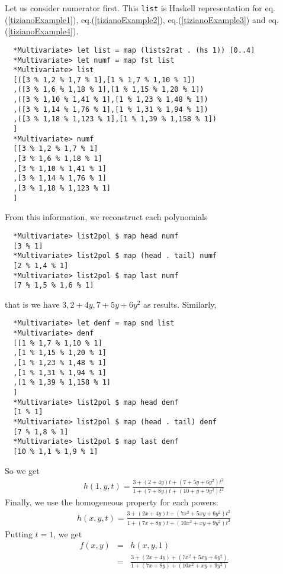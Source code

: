 \documentclass[11pt]{book}
\begin{document}
Let us consider numerator first.
This \texttt{list} is Haskell representation for eq.(\ref{tizianoExample1}), eq.(\ref{tizianoExample2}), eq.(\ref{tizianoExample3}) and eq.(\ref{tizianoExample4}).
\begin{verbatim}
  *Multivariate> let list = map (lists2rat . (hs 1)) [0..4]
  *Multivariate> let numf = map fst list
  *Multivariate> list
  [([3 % 1,2 % 1,7 % 1],[1 % 1,7 % 1,10 % 1])
  ,([3 % 1,6 % 1,18 % 1],[1 % 1,15 % 1,20 % 1])
  ,([3 % 1,10 % 1,41 % 1],[1 % 1,23 % 1,48 % 1])
  ,([3 % 1,14 % 1,76 % 1],[1 % 1,31 % 1,94 % 1])
  ,([3 % 1,18 % 1,123 % 1],[1 % 1,39 % 1,158 % 1])
  ]
  *Multivariate> numf
  [[3 % 1,2 % 1,7 % 1]
  ,[3 % 1,6 % 1,18 % 1]
  ,[3 % 1,10 % 1,41 % 1]
  ,[3 % 1,14 % 1,76 % 1]
  ,[3 % 1,18 % 1,123 % 1]
  ]
\end{verbatim}
From this information, we reconstruct each polynomials
\begin{verbatim}
  *Multivariate> list2pol $ map head numf
  [3 % 1]
  *Multivariate> list2pol $ map (head . tail) numf
  [2 % 1,4 % 1]
  *Multivariate> list2pol $ map last numf
  [7 % 1,5 % 1,6 % 1]
\end{verbatim}
that is we have $3, 2+4y, 7+5y+6y^2$ as results.
Similarly,
\begin{verbatim}
  *Multivariate> let denf = map snd list
  *Multivariate> denf
  [[1 % 1,7 % 1,10 % 1]
  ,[1 % 1,15 % 1,20 % 1]
  ,[1 % 1,23 % 1,48 % 1]
  ,[1 % 1,31 % 1,94 % 1]
  ,[1 % 1,39 % 1,158 % 1]
  ]
  *Multivariate> list2pol $ map head denf
  [1 % 1]
  *Multivariate> list2pol $ map (head . tail) denf
  [7 % 1,8 % 1]
  *Multivariate> list2pol $ map last denf
  [10 % 1,1 % 1,9 % 1]
\end{verbatim}
So we get
\begin{eqnarray}
h(1,y,t) = \frac{3 + (2+4y)t + (7+5y+6y^2)t^2}{1 + (7+8y)t + (10+y+9y^2)t^2}
\end{eqnarray}
Finally, we use the homogeneous property for each powers:
\begin{eqnarray}
h(x,y,t) = \frac{3 + (2x+4y)t + (7x^2+5xy+6y^2)t^2}{1 + (7x+8y)t + (10x^2+xy+9y^2)t^2}
\end{eqnarray}
Putting $t=1$, we get
\begin{eqnarray}
f(x,y) &=& h(x,y,1) \\
&=& \frac{3 + (2x+4y) + (7x^2+5xy+6y^2)}{1 + (7x+8y) + (10x^2+xy+9y^2)}
\end{eqnarray}
\end{document}
